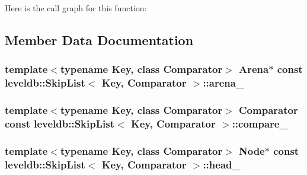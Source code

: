 Here is the call graph for this function\-:




\subsection{Member Data Documentation}
\hypertarget{classleveldb_1_1_skip_list_ae5eb0912ac01174439bc009ab74e366c}{
\subsubsection[{arena\-\_\-}]{\setlength{\rightskip}{0pt plus 5cm}template$<$typename Key, class Comparator$>$ {\bf Arena}$\ast$ const {\bf leveldb\-::\-Skip\-List}$<$ {\bf Key}, {\bf Comparator} $>$\-::arena\-\_\-\hspace{0.3cm}{\ttfamily [private]}}}\label{classleveldb_1_1_skip_list_ae5eb0912ac01174439bc009ab74e366c}
\hypertarget{classleveldb_1_1_skip_list_ab59a01d670b82316fd0532c17cb45a37}{
\subsubsection[{compare\-\_\-}]{\setlength{\rightskip}{0pt plus 5cm}template$<$typename Key, class Comparator$>$ {\bf Comparator} const {\bf leveldb\-::\-Skip\-List}$<$ {\bf Key}, {\bf Comparator} $>$\-::compare\-\_\-\hspace{0.3cm}{\ttfamily [private]}}}\label{classleveldb_1_1_skip_list_ab59a01d670b82316fd0532c17cb45a37}
\hypertarget{classleveldb_1_1_skip_list_abe0e7aa843a469bf63d1d1c9b64582f0}{
\subsubsection[{head\-\_\-}]{\setlength{\rightskip}{0pt plus 5cm}template$<$typename Key, class Comparator$>$ {\bf Node}$\ast$ const {\bf leveldb\-::\-Skip\-List}$<$ {\bf Key}, {\bf Comparator} $>$\-::head\-\_\-\hspace{0.3cm}{\ttfamily [private]}}}\label{classleveldb_1_1_skip_list_abe0e7aa843a469bf63d1d1c9b64582f0}
